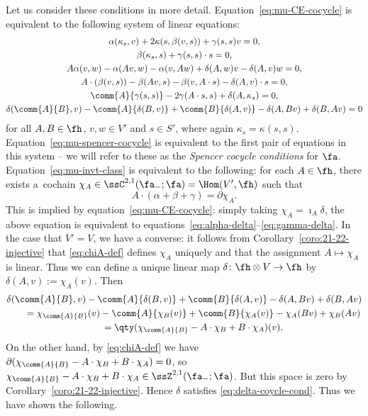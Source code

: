 Let us consider these conditions in more detail. Equation~\eqref{eq:mu-CE-cocycle} is equivalent to the following system of linear equations:
\begin{gather}
	\alpha(\kappa_s,v) + 2\kappa(s,\beta(v,s)) + \gamma(s,s)v = 0,\label{eq:22-spencer-cocycle-vss} \\
	\beta(\kappa_s,s) + \gamma(s,s)\cdot s = 0,\label{eq:22-spencer-cocycle-sss}	\\
	A\alpha(v,w) - \alpha(Av,w) - \alpha(v,Aw) + \delta(A,w)v - \delta(A,v)w = 0,\label{eq:alpha-delta} \\
	A\cdot(\beta(v,s)) - \beta(Av,s) - \beta(v,A\cdot s) - \delta(A,v)\cdot s = 0,\label{eq:beta-delta} \\
	\comm{A}{\gamma(s,s)} - 2\gamma(A\cdot s,s) + \delta(A,\kappa_s) = 0,\label{eq:gamma-delta} \\
	\delta(\comm{A}{B},v) - \comm{A}{\delta(B,v)} + \comm{B}{\delta(A,v)} - \delta(A,Bv) + \delta(B,Av) = 0 \label{eq:delta-coycle-cond}
\end{gather}
for all $A,B\in\fh$, $v,w\in V'$ and $s\in S'$, where again $\kappa_s=\kappa(s,s)$. Equation~\eqref{eq:mu-spencer-cocycle} is equivalent to the first pair of equations in this system -- we will refer to these as the \emph{Spencer cocycle conditions} for $\fa$. Equation~\eqref{eq:mu-invt-class} is equivalent to the following: for each $A\in\fh$, there exists a~cochain $\chi_A\in \ssC^{2,1}(\fa_-;\fa)=\Hom(V',\fh)$ such that
\begin{equation}\label{eq:chiA-def}
	A\cdot(\alpha+\beta+\gamma) = \partial\chi_A.
\end{equation}
This is implied by equation~\eqref{eq:mu-CE-cocycle}: simply taking $\chi_A=\imath_A\delta$, the above equation is equivalent to equations~\eqref{eq:alpha-delta}--\eqref{eq:gamma-delta}. In the case that $V'=V$, we have a converse: it follows from Corollary~\ref{coro:21-22-injective} that \eqref{eq:chiA-def} defines $\chi_A$ uniquely and that the assignment $A\mapsto\chi_A$ is linear. Thus we can define a unique linear map $\delta\colon \fh\otimes V\to\fh$ by $\delta(A,v):=\chi_A(v)$. Then
\begin{gather*}
	\delta(\comm{A}{B},v) - \comm{A}{\delta(B,v)} + \comm{B}{\delta(A,v)} - \delta(A,Bv) + \delta(B,Av)\\
	\qquad= \chi_{\comm{A}{B}}(v) - \comm{A}{\chi_B(v)} + \comm{B}{\chi_A(v)}	- \chi_A(Bv) + \chi_B(Av)	\\
	\qquad= \qty(\chi_{\comm{A}{B}} - A\cdot\chi_B + B\cdot\chi_A)(v).
\end{gather*}
On the other hand, by \eqref{eq:chiA-def} we have
$\partial(\chi_{\comm{A}{B}} - A\cdot\chi_B + B\cdot\chi_A) = 0$,
so $\chi_{\comm{A}{B}} - A\cdot\chi_B + B\cdot\chi_A\in\ssZ^{2,1}(\fa_-;\fa)$. But this space is zero by Corollary~\ref{coro:21-22-injective}. Hence $\delta$ satisfies \eqref{eq:delta-coycle-cond}. Thus we have shown the following.

